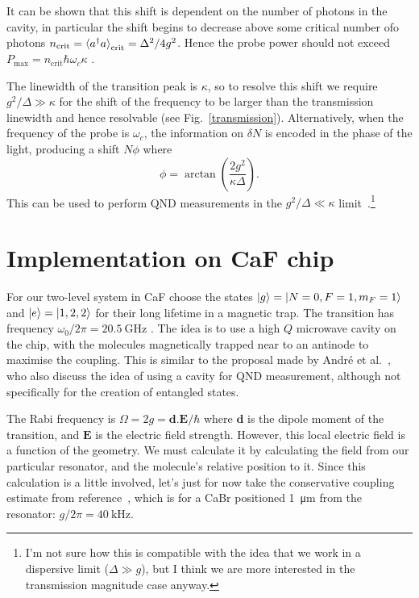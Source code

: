 \documentclass{article}
\begin{document}
It can be shown that this shift is dependent on the number of photons in the
cavity, in particular the shift begins to decrease above some critical number
ofo photons $n_\text{crit} = \braket{a^\dagger a}_\text{crit} = \Delta^2/4g^2$.
Hence the probe power should not exceed $P_\text{max} = n_\text{crit}\hbar
\omega_c \kappa$ \cite{PhysRevA.69.062320}.

The linewidth of the transition peak is $\kappa$, so to resolve this shift we
require $g^2/ \Delta \gg \kappa$ for the shift of the frequency to be larger
than the transmission linewidth and hence resolvable (see
Fig.~\ref{transmission}). Alternatively, when the frequency of the probe is
$\omega_c$, the information on $\delta N$ is encoded in the phase of the light,
producing a shift $N\phi$ where
%
\begin{equation}
  \phi = \arctan \left(\frac{2g^2}{\kappa \Delta}\right).
\end{equation}
%
This can be used to perform QND measurements in the $g^2/ \Delta \ll
\kappa$ limit~\cite{PhysRevA.69.062320}.\footnote{I'm not sure how this is
compatible with the idea that we work in a dispersive limit ($\Delta \gg g$),
but I think we are more interested in the transmission magnitude case anyway.}


\section{Implementation on CaF chip}

For our two-level system in CaF choose the states $\ket{g} = \ket{N=0, F=1,
m_F=1}$ and $\ket{e} = \ket{1, 2, 2}$ for their long lifetime in a magnetic
trap. The transition has frequency $\omega_0/2\pi = \SI{20.5}{\giga\hertz}$
\cite{Williams2018}. The idea is to use a high $Q$ microwave cavity on the
chip, with the molecules magnetically trapped near to an antinode to maximise
the coupling. This is similar to the proposal made by Andr\'e et
al.~\cite{Andre2006}, who also discuss the idea of using a cavity for QND
measurement, although not specifically for the creation of entangled states.

The Rabi frequency is $\Omega = 2g = \mathbf{d}.\mathbf{E}/\hbar$ where $\mathbf{d}$
is the dipole moment of the transition, and $\mathbf{E}$ is the electric field
strength. However, this local electric field is a function of the geometry. We
must calculate it by calculating the field from our particular resonator, and
the molecule's relative position to it. Since this calculation is a little
involved, let's just for now take the conservative coupling estimate from
reference~\cite{Andre2006}, which is for a CaBr positioned
\SI{1}{\micro\meter} from the resonator: $g/2\pi = \SI{40}{\kilo\hertz}$.
\end{document}

